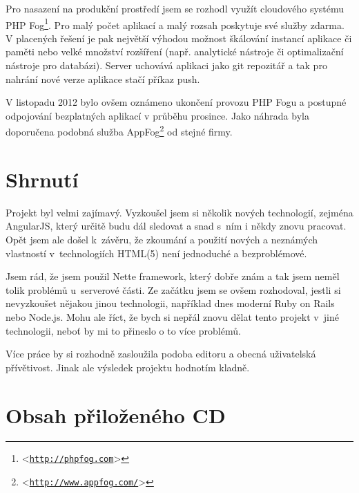 \documentclass[11pt,twoside,a4paper]{book}
\let\oldUrl\url									%
\renewcommand\url[1]{<\texttt{\oldUrl{#1}}>}
\begin{document}
Pro nasazení na produkční prostředí jsem se rozhodl využít cloudového systému PHP Fog\footnote{\url{http://phpfog.com}}. Pro malý počet aplikací a malý rozsah poskytuje své služby zdarma. V placených řešení je pak největší výhodou možnost škálování instancí aplikace či paměti nebo velké množství rozšíření (např. analytické nástroje či optimalizační nástroje pro databázi). Server uchovává aplikaci jako git repozitář a tak pro nahrání nové verze aplikace stačí příkaz push.

V listopadu 2012 bylo ovšem oznámeno ukončení provozu PHP Fogu a postupné odpojování bezplatných aplikací v průběhu prosince. Jako náhrada byla doporučena podobná služba AppFog\footnote{\url{http://www.appfog.com/}} od stejné firmy.



\chapter{Shrnutí}
Projekt byl velmi zajímavý. Vyzkoušel jsem si několik nových technologií, zejména AngularJS, který určitě budu dál sledovat a snad s~ním i někdy znovu pracovat. Opět jsem ale došel k~závěru, že zkoumání a použití nových a neznámých vlastností v~technologiích HTML(5) není jednoduché a bezproblémové.

Jsem rád, že jsem použil Nette framework, který dobře znám a tak jsem neměl tolik problémů u~serverové části. Ze začátku jsem se ovšem rozhodoval, jestli si nevyzkoušet nějakou jinou technologii, například dnes moderní Ruby on Rails nebo Node.js. Mohu ale říct, že bych si nepřál znovu dělat tento projekt v~jiné technologii, neboť by mi to přineslo o to více problémů.

Více práce by si rozhodně zasloužila podoba editoru a obecná uživatelská přívětivost. Jinak ale výsledek projektu hodnotím kladně.





{
\def\CS{$\cal C\kern-0.1667em\lower.5ex\hbox{$\cal S$}\kern-0.075em $}

}




\appendix	

\printnomenclature


\chapter{Obsah přiloženého CD}

\end{document}
